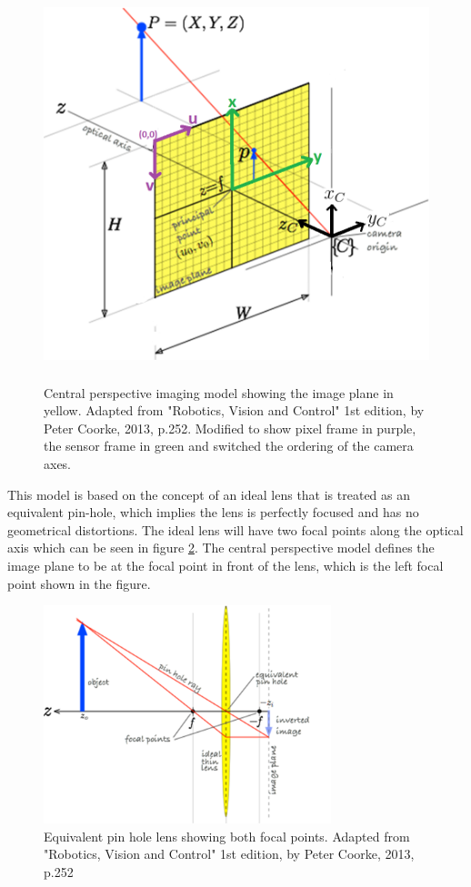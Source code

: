 \begin{figure}[htb]
	\centering
    \includegraphics[height=4.5in]{figures/projection_model.png}
    \caption[Projection model]{Central perspective imaging model showing the image plane in yellow.  Adapted from "Robotics, Vision and Control" 1st edition, by Peter Coorke, 2013, p.252. Modified to show pixel frame in purple, the sensor frame in green and switched the ordering of the camera axes.}
    \label{projection_model}
\end{figure}
 
 This model is based on the concept of an ideal lens that is treated as an equivalent pin-hole, which implies the lens is perfectly focused and has no geometrical distortions.  The ideal lens will have two focal points along the optical axis which can be seen in figure \ref{focal_points}.  The central perspective model defines the image plane to be at the focal point in front of the lens, which is the left focal point shown in the figure.  

\begin{figure}[htb]
	\centering
    \includegraphics[height=2.5in]{figures/projections_two_focal.png}
    \caption[Focal points]{Equivalent pin hole lens showing both focal points. Adapted from "Robotics, Vision and Control" 1st edition, by Peter Coorke, 2013, p.252}
    \label{focal_points}
\end{figure} 

